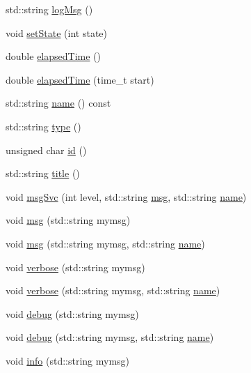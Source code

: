 \begin{DoxyCompactItemize}
\item 
std\+::string \hyperlink{classProcessus_a42fdeb17dc13ba854222666b6aa29b61}{log\+Msg} ()
\item 
void \hyperlink{classProcessus_ad38cde0f1bcefa00b068e7947b8af927}{set\+State} (int state)
\item 
double \hyperlink{classProcessus_aecca96218c65bc805c988cd95447df55}{elapsed\+Time} ()
\item 
double \hyperlink{classProcessus_a06d3815ad56593dfd0d3c1f534f8b146}{elapsed\+Time} (time\+\_\+t start)
\item 
std\+::string \hyperlink{classObject_a300f4c05dd468c7bb8b3c968868443c1}{name} () const
\item 
std\+::string \hyperlink{classObject_a84f99f70f144a83e1582d1d0f84e4e62}{type} ()
\item 
unsigned char \hyperlink{classObject_af99145335cc61ff6e2798ea17db009d2}{id} ()
\item 
std\+::string \hyperlink{classObject_a73a0f1a41828fdd8303dd662446fb6c3}{title} ()
\item 
void \hyperlink{classObject_a3f9d5537ebce0c0f2bf6ae4d92426f3c}{msg\+Svc} (int level, std\+::string \hyperlink{classObject_a58b2d0618c2d08cf2383012611528d97}{msg}, std\+::string \hyperlink{classObject_a300f4c05dd468c7bb8b3c968868443c1}{name})
\item 
void \hyperlink{classObject_a58b2d0618c2d08cf2383012611528d97}{msg} (std\+::string mymsg)
\item 
void \hyperlink{classObject_ac5d59299273cee27aacf7de00d2e7034}{msg} (std\+::string mymsg, std\+::string \hyperlink{classObject_a300f4c05dd468c7bb8b3c968868443c1}{name})
\item 
void \hyperlink{classObject_a83d2db2df682907ea1115ad721c1c4a1}{verbose} (std\+::string mymsg)
\item 
void \hyperlink{classObject_a2d4120195317e2a3c6532e8bb9f3da68}{verbose} (std\+::string mymsg, std\+::string \hyperlink{classObject_a300f4c05dd468c7bb8b3c968868443c1}{name})
\item 
void \hyperlink{classObject_aac010553f022165573714b7014a15f0d}{debug} (std\+::string mymsg)
\item 
void \hyperlink{classObject_a6c9a0397ca804e04d675ed05683f5420}{debug} (std\+::string mymsg, std\+::string \hyperlink{classObject_a300f4c05dd468c7bb8b3c968868443c1}{name})
\item 
void \hyperlink{classObject_a644fd329ea4cb85f54fa6846484b84a8}{info} (std\+::string mymsg)
\item 

\end{DoxyCompactItemize}
